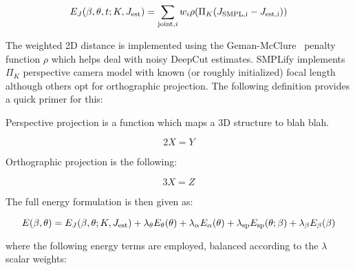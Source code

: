 

    \begin{equation}
        E_{J}(\beta, \theta, t; K, J_\mathrm{est}) = \sum_{\mathrm{joint}, i} w_{i} \rho(\Pi_{K}(J_\mathrm{\operatorname{SMPL}, i} - J_\mathrm{est, i}))
    \end{equation}

    The weighted 2D distance is implemented using the Geman-McClure~\cite{xxx} penalty function $\rho$ which helps deal with noisy DeepCut estimates. SMPLify implements $\Pi_{K}$ perspective camera model with known (or roughly initialized) focal length although others opt for orthographic projection. The following definition provides a quick primer for this:

    \begin{definition}

        Perspective projection is a function which maps a 3D structure to blah blah.

        \begin{equation}
            2X = Y
        \end{equation}

        Orthographic projection is the following:

        \begin{equation}
            3X = Z
        \end{equation}

    \end{definition}

    The full energy formulation is then given as:

    \begin{equation}
        E(\beta, \theta) = E_{J}(\beta, \theta; K, J_{\text{est}}) + \lambda_{\theta}E_{\theta}(\theta) + \lambda_{\alpha}E_{\alpha}(\theta) + \lambda_{\text{sp}}E_{\text{sp}}(\theta; \beta) + \lambda_{\beta}E_{\beta}(\beta)
    \end{equation}

    where the following energy terms are employed, balanced according to the $\lambda$ scalar weights:

